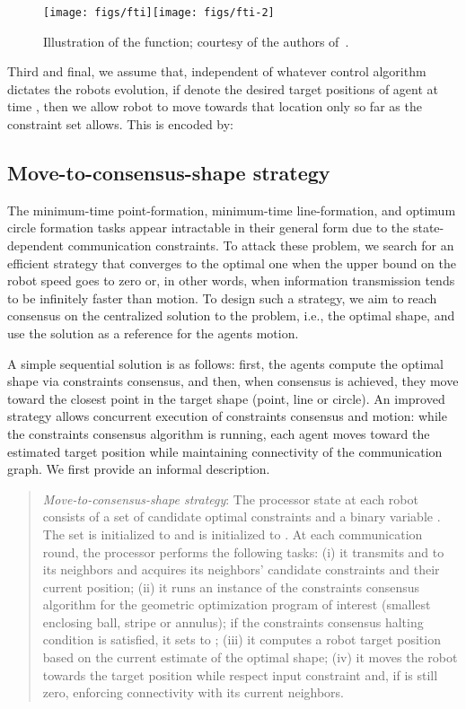 \documentclass[onecolumn,journal,letterpaper]{IEEEtran}
\begin{document}
\begin{figure}[h]
\begin{center}
\texttt{[image: figs/fti]}\texttt{[image: figs/fti-2]}\caption{Illustration of the  function; courtesy of the authors
    of~\cite{FB-JC-SM:09}.}
  \label{fig:fti}
\end{center}
\end{figure}

Third and final, we assume that, independent of whatever control algorithm
dictates the robots evolution, if  denote
the desired target positions of agent  at time , then we allow
robot  to move towards that location only so far as the constraint set
allows. This is encoded by:



\subsection{Move-to-consensus-shape strategy}
The minimum-time point-formation, minimum-time line-formation, and optimum
circle formation tasks appear intractable in their general form due to the
state-dependent communication constraints.  To attack these problem, we
search for an efficient strategy that converges to the optimal one when the
upper bound on the robot speed  goes to zero or, in other words,
when information transmission tends to be infinitely faster than motion.
To design such a strategy, we aim to reach consensus on the centralized
solution to the problem, i.e., the optimal shape, and use the solution as a
reference for the agents motion.

A simple sequential solution is as follows: first, the agents compute the
optimal shape via constraints consensus, and then, when consensus is
achieved, they move toward the closest point in the target shape (point,
line or circle).  An improved strategy allows concurrent execution of
constraints consensus and motion: while the constraints consensus algorithm
is running, each agent moves toward the estimated target position while
maintaining connectivity of the communication graph. We first provide an
informal description.

\begin{quote}
  \emph{Move-to-consensus-shape strategy}: The processor state at each
  robot  consists of a set  of  candidate optimal
  constraints and a binary variable .  The set
   is initialized to  and
   is initialized to . At each communication round,
  the processor performs the following tasks: (i) it transmits
   and  to its neighbors and acquires its
  neighbors' candidate constraints and their current position; (ii) it runs
  an instance of the constraints consensus algorithm for the geometric
  optimization program of interest (smallest enclosing ball, stripe or
  annulus); if the constraints consensus halting condition is satisfied, it
  sets  to ; (iii) it computes a robot target position
  based on the current estimate of the optimal shape; (iv) it moves the
  robot towards the target position while respect input constraint and, if
   is still zero, enforcing connectivity with its current
  neighbors.
\end{quote}
\end{document}
